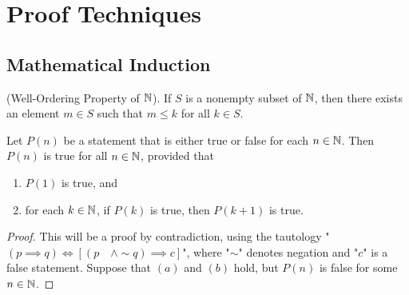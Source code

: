 \chapter{Proof Techniques}

\section{Mathematical Induction}

\begin{axiom}(Well-Ordering Property of $\mathbb{N}$).
	If $S$ is a nonempty subset of $\mathbb{N}$, then there exists an element $m\in S$ such that $m\leq k$ for all $k\in S$.
\end{axiom}

\begin{theorem}
	Let $P(n)$ be a statement that is either true or false for each $n\in \mathbb{N}$. Then $P(n)$ is true for all $n\in\mathbb{N}$, provided that
	\begin{enumerate}
		\item $P(1)$ is true, and
		\item for each $k\in \mathbb{N}$, if $P(k)$ is true, then $P(k+1)$ is true.
	\end{enumerate}
\end{theorem}

\begin{proof}
	This will be a proof by contradiction, using the tautology "$(p\implies q) \Leftrightarrow [(p \quad \land \sim q) \implies c]$", where "$\sim$" denotes negation and "$c$" is a false statement. Suppose that $(a)$ and $(b)$ hold, but $P(n)$ is false for some $n\in\mathbb{N}$.
\end{proof}
